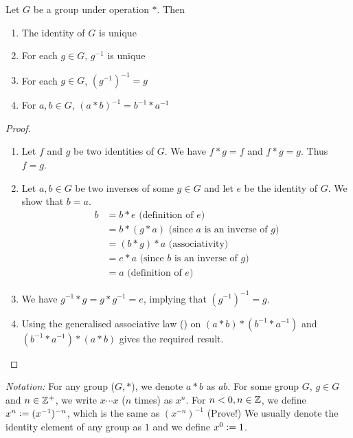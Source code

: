 \medskip

\begin{theorem} \label{thm:group-basics}
    Let $G$ be a group under operation $\ast$. Then
    \begin{enumerate}
        \item The identity of $G$ is unique 
        \item For each $g \in G$, $g^{-1}$ is unique
        \item For each $g \in G$, $(g^{-1})^{-1} = g$
        \item For $a,b \in G$, $(a \ast b)^{-1} = b^{-1} \ast a^{-1}$
    \end{enumerate}
\end{theorem}

\begin{proof} \phantom{hi}
    \begin{enumerate} 
        \item Let $f$ and $g$ be two identities of $G$. We have $f \ast g = f$ and $f \ast g = g$. Thus $f=g$.
        \item Let $a,b \in G$ be two inverses of some $g \in G$ and let $e$ be the identity of $G$. We show that $b = a$.
        \begin{align*}
            b &= b \ast e \text{ (definition of $e$)} \\
            &= b \ast (g \ast a) \text{ (since $a$ is an inverse of $g$)} \\
            &= (b \ast g) \ast a \text{ (associativity)} \\
            &= e \ast a \text{ (since $b$ is an inverse of $g$)} \\
            &= a \text{ (definition of $e$)}
        \end{align*}
        \item We have $g^{-1} \ast g = g \ast g^{-1} = e$, implying that $(g^{-1})^{-1} = g$.
        \item Using the generalised associative law () on $(a \ast b) \ast (b^{-1} \ast a^{-1})$ and $(b^{-1} \ast a^{-1}) \ast (a \ast b)$ gives the required result.
    \end{enumerate}
\end{proof}

\emph{Notation:} For any group ($G, \ast$), we denote $a \ast b$ as $ab$. For some group $G$, $g \in G$ and $n \in \mathbb{Z}^+$, we write $x \cdots x$ ($n$ times) as $x^n$. For $n<0, n \in \mathbb{Z}$, we define $x^n \vcentcolon= (x^{-1})^{-n}$, which is the same as $(x^{-n})^{-1}$ (Prove!) We usually denote the identity element of any group as $1$ and we define $x^0 \vcentcolon= 1$.


